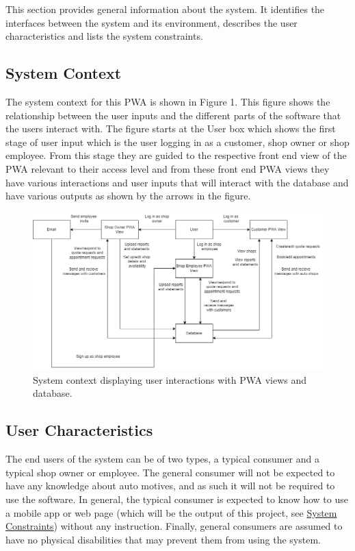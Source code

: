 \documentclass[12pt]{article}
\begin{document}
This section provides general information about the system.  It identifies the
interfaces between the system and its environment, describes the user
characteristics and lists the system constraints.

\subsection{System Context} \label{sec:SystemContext}

The system context for this PWA is shown in Figure 1. This figure shows the relationship between the user inputs and the different parts of the software that the users interact with. The figure starts at the User box which shows the first stage of user input which is the user logging in as a customer, shop owner or shop employee. From this stage they are guided to the respective front end view of the PWA relevant to their access level and from these front end PWA views they have various interactions and user inputs that will interact with the database and have various outputs as shown by the arrows in the figure.

\begin{figure}[h!]
\begin{center}
 \includegraphics[width=1\textwidth]{SystemContext}
\caption{System context displaying user interactions with PWA views and database. }
\label{Fig_SystemContext} 
\end{center}
\end{figure}

\subsection{User Characteristics} \label{SecUserCharacteristics}

The end users of the system can be of two types, a typical consumer and a typical shop owner or employee. The general consumer will not be expected to have any knowledge about auto motives, and as such it will not be required to use the software. In general, the typical consumer is expected to know how to use a mobile app or web page (which will be the output of this project, see \hyperref[constraints]{System Constraints}) without any instruction. Finally, general consumers are assumed to have no physical disabilities that may prevent them from using the system. 
\end{document}
